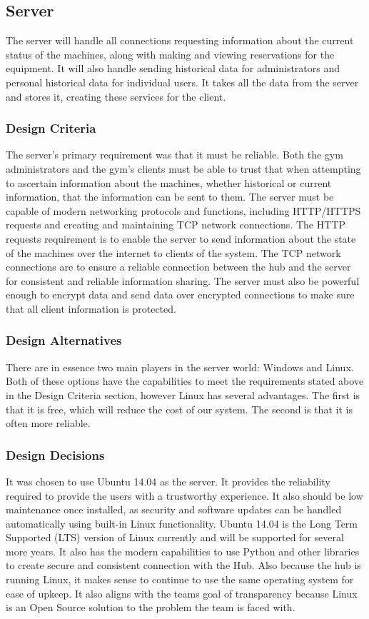 \documentclass[PPFS.tex]{template/subfiles}
\begin{document}
\subsection{Server}
The server will handle all connections requesting information about the current status of the machines, along with making and viewing reservations for the equipment. It will also handle sending historical data for administrators and personal historical data for individual users. It takes all the data from the server and stores it, creating these services for the client.

\subsubsection{Design Criteria}
The server's primary requirement was that it must be reliable. Both the gym administrators and the gym's clients must be able to trust that when attempting to ascertain information about the machines, whether historical or current information, that the information can be sent to them. The server must be capable of modern networking protocols and functions, including HTTP/HTTPS requests and creating and maintaining TCP network connections. The HTTP requests requirement is to enable the server to send information about the state of the machines over the internet to clients of the system. The TCP network connections are to ensure a reliable connection between the hub and the server for consistent and reliable information sharing. The server must also be powerful enough to encrypt data and send data over encrypted connections to make sure that all client information is protected.

\subsubsection{Design Alternatives}
There are in essence two main players in the server world: Windows and Linux. Both of these options have the capabilities to meet the requirements stated above in the Design Criteria section, however Linux has several advantages. The first is that it is free, which will reduce the cost of our system. The second is that it is often more
reliable.

\subsubsection{Design Decisions}
It was chosen to use Ubuntu 14.04 as the server. It provides the reliability required to provide the users with a trustworthy experience. It also should be low maintenance once installed, as security and software updates can be handled automatically using built-in Linux functionality. Ubuntu 14.04 is the Long Term Supported (LTS) version of Linux currently and will be supported for
several more years. It also has the modern capabilities to use Python and other libraries to create secure and consistent connection with the Hub. Also because the hub is running Linux, it makes sense to continue to use the same operating system for ease of upkeep. It also aligns with the teams goal of transparency because Linux is an Open Source solution to the problem the team is faced with.
\end{document}
